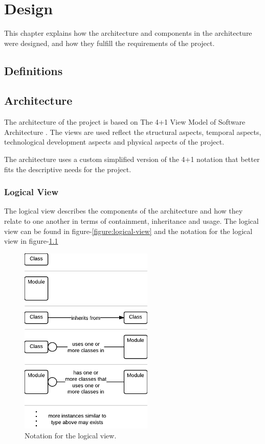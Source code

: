 
\chapter{Design}

\minitoc
This chapter explains how the architecture and components in the architecture were designed, and how they fulfill the requirements of the project.


\clearpage


\section{Definitions}


\section{Architecture}
The architecture of the project is based on The 4+1 View
Model of Software Architecture \cite{Kruchten}. The views are used reflect the structural aspects, temporal aspects, technological development aspects and physical aspects of the project.

The architecture uses a custom simplified version of the 4+1 notation that better fits the descriptive needs for the project.


\subsection{Logical View}
The logical view describes the components of the architecture and how they relate to one another in terms of containment, inheritance and usage. The logical view can be found in figure-\ref{figure:logical-view} and the notation for the logical view in figure-\ref{figure:logical-view-notation}

\begin{figure}[H]
\centerline{\includegraphics[width=2.5in]{image/architecture-logical-view-notation.png}}
\caption{Notation for the logical view.}
\label{figure:logical-view-notation}
\end{figure}

